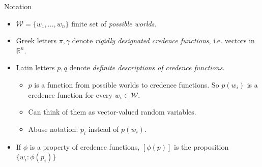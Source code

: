 \documentclass[aspectratio=169, dvipsnames]{beamer}
\newcommand{\R}{\mathbb{R}}
\newcommand{\W}{\mathcal{W}}
\begin{document}
\begin{frame}{Notation}
  \begin{itemize}
    \item $\W =\{w_1, ..., w_n\}$ finite set of \textit{possible worlds}.
    \item Greek letters $\pi, \gamma$ denote \textit{rigidly designated credence functions}, i.e. vectors in $\R^n$.
    \item Latin letters $p, q$ denote \textit{definite descriptions of credence functions}.
      \begin{itemize}
      \item $p$ is a function from possible worlds to credence functions. So $p(w_i)$ is a credence function for every $w_i \in \W$.
      \item Can think of them as vector-valued random variables.
      \item Abuse notation: $p_i$ instead of $p(w_i)$.
      \end{itemize}
    \item If $\phi$ is a property of credence functions, $[\phi(p)]$ is the proposition $\{w_i: \phi(p_i)\}$
  \end{itemize}
\end{frame}
\end{document}
